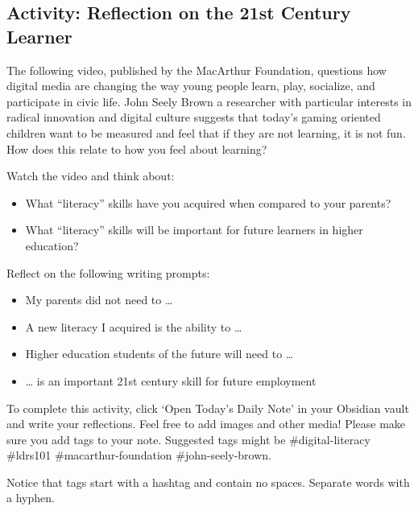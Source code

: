 \documentclass[
]{book}
\providecommand{\tightlist}{%
  \setlength{\itemsep}{0pt}\setlength{\parskip}{0pt}}
\theoremstyle{definition}
\theoremstyle{definition}
\theoremstyle{definition}
\theoremstyle{definition}
\theoremstyle{remark}
\begin{document}
\hypertarget{activity-reflection-on-the-21st-century-learner}{%
\subsection*{Activity: Reflection on the 21st Century Learner}\label{activity-reflection-on-the-21st-century-learner}}

\begin{reflect}
The following video, published by the MacArthur Foundation, questions how digital media are changing the way young people learn, play, socialize, and participate in civic life. John Seely Brown a researcher with particular interests in radical innovation and digital culture suggests that today's gaming oriented children want to be measured and feel that if they are not learning, it is not fun. How does this relate to how you feel about learning?

Watch the video and think about:

\begin{itemize}
\tightlist
\item
  What ``literacy'' skills have you acquired when compared to your parents?\\
\item
  What ``literacy'' skills will be important for future learners in higher education?
\end{itemize}

Reflect on the following writing prompts:

\begin{itemize}
\tightlist
\item
  My parents did not need to \ldots{}\\
\item
  A new literacy I acquired is the ability to \ldots{}\\
\item
  Higher education students of the future will need to \ldots{}\\
\item
  \ldots{} is an important 21st century skill for future employment
\end{itemize}

To complete this activity, click `Open Today's Daily Note' in your Obsidian vault and write your reflections. Feel free to add images and other media! Please make sure you add tags to your note. Suggested tags might be \#digital-literacy \#ldrs101 \#macarthur-foundation \#john-seely-brown.

Notice that tags start with a hashtag and contain no spaces. Separate words with a hyphen.
\end{reflect}
\end{document}
